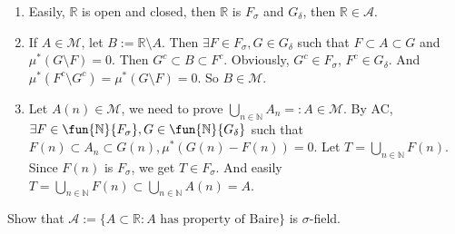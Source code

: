 \documentclass{ctexart}
\begin{document}
\begin{solution}
 \begin{enumerate}
   \item Easily, \(\mathbb{R}\) is open and closed, then \(\mathbb{R}\) is \(F_{\sigma}\) and \(G_{\delta}\), 
     then \(\mathbb{R} \in \mathcal{A}\). 
   \item If \(A \in \mathcal{M}\), let \(B:=\mathbb{R}\setminus A\). 
  Then \(\exists F \in F_{\sigma} , G \in G_{\delta}\) such that \( F\subset A \subset G\) 
  and \(\mu^{*}(G\setminus F)=0\). Then \(G^c \subset B \subset F^c\). 
  Obviously, \(G^c \in F_{\sigma}\), \(F^c \in G_{\delta}\). 
  And \(\mu^{*}(F^c\setminus G^c)=\mu^{*}(G\setminus F)=0\). 
  So \(B \in \mathcal{M}\). 
    \item Let \(A(n) \in \mathcal{M}\), we need to prove \(\bigcup_{n \in \mathbb{N}} A_n =:A\in \mathcal{M}\). 
  By AC,  \(\exists F \in \fun{ \mathbb{N}}{F_{\sigma}},G \in \fun{ \mathbb{N}}{G_{\delta}}\) such that \(F(n)\subset A_n \subset G(n),\mu^{*}(G(n)-F(n))=0\). 
  Let \(T=\bigcup_{n \in \mathbb{N}} F(n)\). Since \(F(n)\) is \(F_{\sigma}\), we get \(T \in F_{\sigma}\). 
  And easily \(T=\bigcup_{n \in \mathbb{N}} F(n) \subset \bigcup_{n \in \mathbb{N}} A(n)=A\). 
 \end{enumerate} 
\end{solution}

\begin{problem}
  Show that \(\mathcal{A}:=\{A \subset \mathbb{R}:A \text{ has property of Baire}\}\) is \(\sigma\)-field. 
\end{problem}
\end{document}
